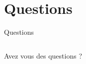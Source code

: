 \documentclass{beamer}
\begin{document}
    \section*{Questions}
	\begin{frame}{Questions}
	    \begin{columns}[c]
		\begin{column}{5cm}
		    Avez vous des questions ?
		\end{column}
    		\begin{column}{5cm}
    		    \begin{figure}
		    \end{figure}
		\end{column}
	    \end{columns}
	\end{frame}
\end{document}
